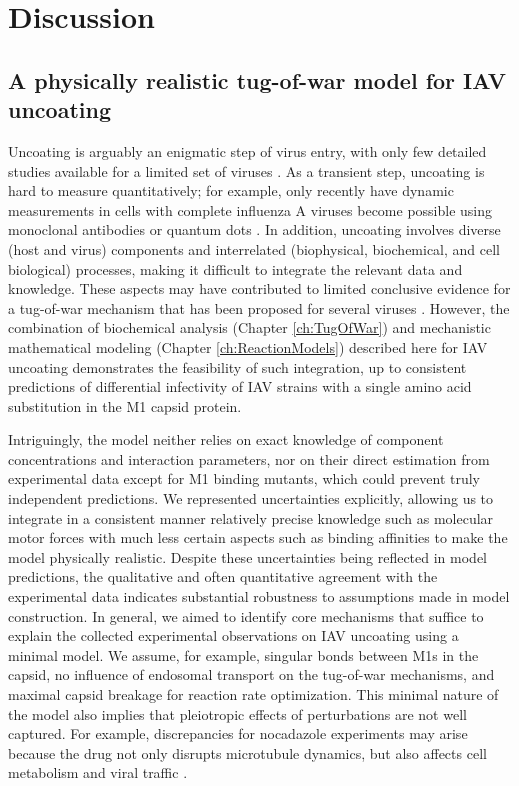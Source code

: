 \section{Discussion}

\subsection{A physically realistic tug-of-war model for IAV uncoating}

Uncoating is arguably an enigmatic step of virus entry, with only few detailed studies available for a limited set of viruses \cite{helenius2018virus, walsh2019exploitation}. As a transient step, uncoating is hard to measure quantitatively; for example, only recently have dynamic measurements in cells with complete influenza A viruses become possible using monoclonal antibodies \cite{banerjee2014influenza} or quantum dots \cite{qin2019real}. In addition, uncoating involves diverse (host and virus) components and interrelated (biophysical, biochemical, and cell biological) processes, making it difficult to integrate the relevant data and knowledge. These aspects may have contributed to limited conclusive evidence for a tug-of-war mechanism that has been proposed for several viruses \cite{banerjee2014influenza, lukic2014hiv, radtke2010plus, strunze2011kinesin}. However, the combination of biochemical analysis (Chapter \ref{ch:TugOfWar}) and mechanistic mathematical modeling (Chapter \ref{ch:ReactionModels}) described here for IAV uncoating demonstrates the feasibility of such integration, up to consistent predictions of differential infectivity of IAV strains with a single amino acid substitution in the M1 capsid protein.

Intriguingly, the model neither relies on exact knowledge of component concentrations and interaction parameters, nor on their direct estimation from experimental data except for M1 binding mutants, which could prevent truly independent predictions. We represented uncertainties explicitly, allowing us to integrate in a consistent manner relatively precise knowledge such as molecular motor forces with much less certain aspects such as binding affinities to make the model physically realistic. Despite these uncertainties being reflected in model predictions, the qualitative and often quantitative agreement with the experimental data indicates substantial robustness to assumptions made in model construction. In general, we aimed to identify core mechanisms that suffice to explain the collected experimental observations on IAV uncoating using a minimal model. We assume, for example, singular bonds between M1s in the capsid, no influence of endosomal transport on the tug-of-war mechanisms, and maximal capsid breakage for reaction rate optimization. This minimal nature of the model also implies that pleiotropic effects of perturbations are not well captured. For example, discrepancies for nocadazole experiments may arise because the drug not only disrupts microtubule dynamics, but also affects cell metabolism and viral traffic \cite{naghavi2017microtubule}.

